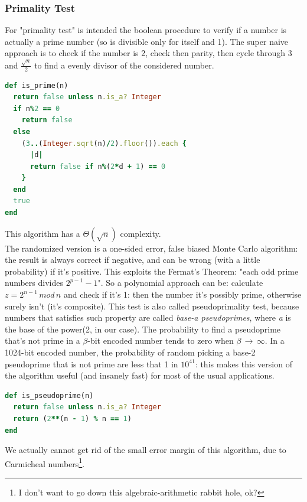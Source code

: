 \documentclass{article}
\begin{document}
			\subsubsection{Primality Test}		
				For "primality test" is intended the boolean procedure to verify if a number is actually a prime number (so is divisible only for itself and 1). The super naive approach is to check if the number is 2, check then parity, then cycle through 3 and $\frac{\sqrt{n}}{2}$ to find a evenly divisor of the considered number.
				\begin{lstlisting}[language=Ruby]
def is_prime(n) 
  return false unless n.is_a? Integer
  if n%2 == 0                                                                                                    
    return false                                                                                                 
  else                                                                                                            
    (3..(Integer.sqrt(n)/2).floor()).each {                                                                       
      |d|                                                                                                        
      return false if n%(2*d + 1) == 0                                                                           
    }                                                                                                            
  end                                                                                                            
  true                                                                                                            
end   
				\end{lstlisting}
				This algorithm has a $\Theta(\sqrt{n})$ complexity.\\
				The randomized version is a one-sided error, false biased Monte Carlo algorithm: the result is always correct if negative, and can be wrong (with a little probability) if it's positive. This exploits the Fermat's Theorem: "each odd prime numbers divides $2^{p - 1} - 1$". So a polynomial approach can be: calculate $z = 2^{n - 1} \,mod\, n$ and check if it's 1: then the number it's possibly prime, otherwise surely isn't (it's composite). This test is also called pseudoprimality test, because numbers that satisfies such property are called \textit{base-a pseudoprimes}, where \emph{a} is the base of the power(2, in our case). The probability to find a pseudoprime that's not prime in a $\beta$-bit encoded number tends to zero when $\beta \,\rightarrow\, \infty$. In a 1024-bit encoded number, the probability of random picking a base-2 pseudoprime that is not prime are less that 1 in $10^{41}$: this makes this version of the algorithm useful (and insanely fast) for most of the usual applications.
				\begin{lstlisting}[language=Ruby]
def is_pseudoprime(n)
  return false unless n.is_a? Integer
  return (2**(n - 1) % n == 1)                                                                                    
end
				\end{lstlisting}
				We actually cannot get rid of the small error margin of this algorithm, due to Carmicheal numbers\footnote{I don't want to go down this algebraic-arithmetic rabbit hole, ok?}.
\end{document}
